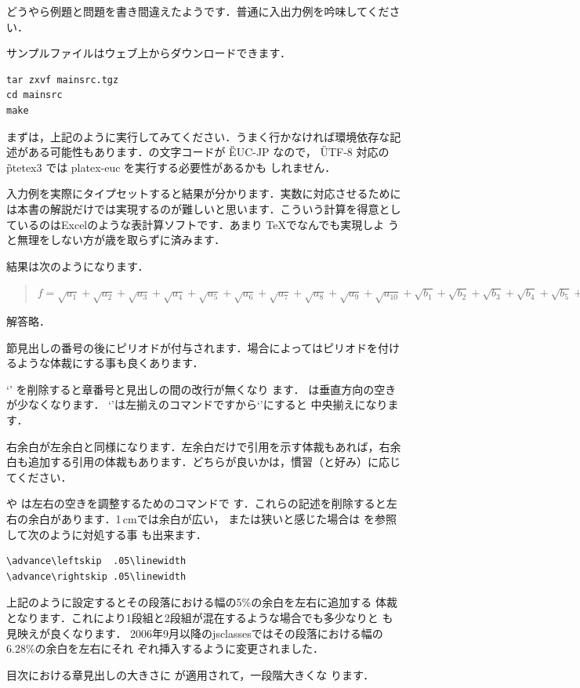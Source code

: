 \begin{description}
 どうやら例題と問題を書き間違えたようです．普通に入出力例を吟味してくださ
 い．

サンプルファイルはウェブ上からダウンロードできます．
\begin{verbatim}
tar zxvf mainsrc.tgz
cd mainsrc
make	
\end{verbatim}
まずは，上記のように実行してみてください．うまく行かなければ環境依存な記
述がある可能性もあります．の文字コードが \G{EUC-JP} なので，
\G{UTF-8} 対応の \G{ptetex3} では platex-euc を実行する必要性があるかも
しれません．

入力例を実際にタイプセットすると結果が分かります．実数に対応させるために
は本書の解説だけでは実現するのが難しいと思います．こういう計算を得意とし
ているのはExcelのような表計算ソフトです．あまり \TeX でなんでも実現しよ
うと無理をしない方が歳を取らずに済みます．

結果は次のようになります．
\begin{quote}
\newcommand*\Qa[1]{\sqrt{a_{#1}} + }
\newcommand*\Qb[1]{\sqrt{b_{#1}} + }
$f = \Qa{1}\Qa{2}\Qa{3}\Qa{4}\Qa{5}\Qa{6}\Qa{7}\Qa{8}
\Qa{9}\Qa{10}\Qb{1}\Qb{2}\Qb{3}\Qb{4}\Qb{5}\Qb{6}\Qb{7}\Qb{8}\Qb{9}
\sqrt{b_{10}}$	
\end{quote}

解答略．

\end{description}

\begin{description}
節見出しの番号の後にピリオドが付与されます．場合によってはピリオドを付け
るような体裁にする事も良くあります．

`' を削除すると章番号と見出しの間の改行が無くなり
 ます． は垂直方向の空きが少なくなります．
`'は左揃えのコマンドですから`'にすると
中央揃えになります．

右余白が左余白と同様になります．左余白だけで引用を示す体裁もあれば，右余
白も追加する引用の体裁もあります．どちらが良いかは，慣習（と好み）に応じてください．

 や  は左右の空きを調整するためのコマンドで
 す．これらの記述を削除すると左右の余白があります．1\,cmでは余白が広い，
または狭いと感じた場合は  を参照して次のように対処する事
 も出来ます．
\begin{verbatim}
\advance\leftskip  .05\linewidth
\advance\rightskip .05\linewidth
\end{verbatim}
 上記のように設定するとその段落における幅の5\%の余白を左右に追加する
 体裁となります．これにより1段組と2段組が混在するような場合でも多少なりと
 も見映えが良くなります．
 2006年9月以降のjsclassesではその段落における幅の6.28\%の余白を左右にそれ
 ぞれ挿入するように変更されました．

目次における章見出しの大きさに  が適用されて，一段階大きくな
ります．
\end{description}

